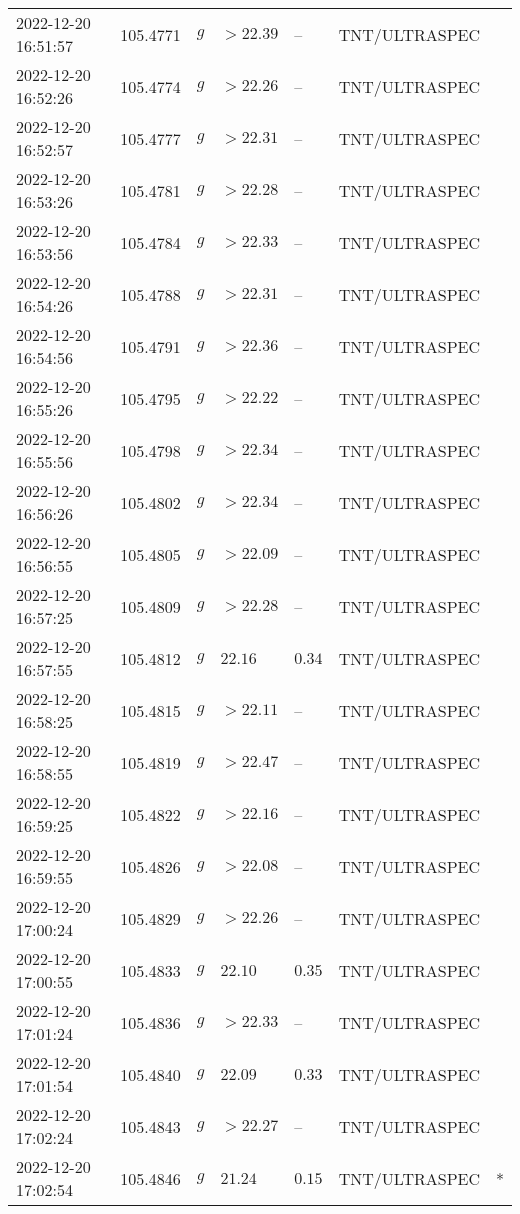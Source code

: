 \documentclass{nature_plusfigure}
\begin{document}
\begin{supplement}
\begin{center}
\begin{longtable}{lllllll}
2022-12-20 16:51:57 & 105.4771 & $g$ & $>22.39$ & -- & TNT/ULTRASPEC &  \\ 
2022-12-20 16:52:26 & 105.4774 & $g$ & $>22.26$ & -- & TNT/ULTRASPEC &  \\ 
2022-12-20 16:52:57 & 105.4777 & $g$ & $>22.31$ & -- & TNT/ULTRASPEC &  \\ 
2022-12-20 16:53:26 & 105.4781 & $g$ & $>22.28$ & -- & TNT/ULTRASPEC &  \\ 
2022-12-20 16:53:56 & 105.4784 & $g$ & $>22.33$ & -- & TNT/ULTRASPEC &  \\ 
2022-12-20 16:54:26 & 105.4788 & $g$ & $>22.31$ & -- & TNT/ULTRASPEC &  \\ 
2022-12-20 16:54:56 & 105.4791 & $g$ & $>22.36$ & -- & TNT/ULTRASPEC &  \\ 
2022-12-20 16:55:26 & 105.4795 & $g$ & $>22.22$ & -- & TNT/ULTRASPEC &  \\ 
2022-12-20 16:55:56 & 105.4798 & $g$ & $>22.34$ & -- & TNT/ULTRASPEC &  \\ 
2022-12-20 16:56:26 & 105.4802 & $g$ & $>22.34$ & -- & TNT/ULTRASPEC &  \\ 
2022-12-20 16:56:55 & 105.4805 & $g$ & $>22.09$ & -- & TNT/ULTRASPEC &  \\ 
2022-12-20 16:57:25 & 105.4809 & $g$ & $>22.28$ & -- & TNT/ULTRASPEC &  \\ 
2022-12-20 16:57:55 & 105.4812 & $g$ & $22.16$ & $0.34$ & TNT/ULTRASPEC &  \\ 
2022-12-20 16:58:25 & 105.4815 & $g$ & $>22.11$ & -- & TNT/ULTRASPEC &  \\ 
2022-12-20 16:58:55 & 105.4819 & $g$ & $>22.47$ & -- & TNT/ULTRASPEC &  \\ 
2022-12-20 16:59:25 & 105.4822 & $g$ & $>22.16$ & -- & TNT/ULTRASPEC &  \\ 
2022-12-20 16:59:55 & 105.4826 & $g$ & $>22.08$ & -- & TNT/ULTRASPEC &  \\ 
2022-12-20 17:00:24 & 105.4829 & $g$ & $>22.26$ & -- & TNT/ULTRASPEC &  \\ 
2022-12-20 17:00:55 & 105.4833 & $g$ & $22.10$ & $0.35$ & TNT/ULTRASPEC &  \\ 
2022-12-20 17:01:24 & 105.4836 & $g$ & $>22.33$ & -- & TNT/ULTRASPEC &  \\ 
2022-12-20 17:01:54 & 105.4840 & $g$ & $22.09$ & $0.33$ & TNT/ULTRASPEC &  \\ 
2022-12-20 17:02:24 & 105.4843 & $g$ & $>22.27$ & -- & TNT/ULTRASPEC &  \\ 
2022-12-20 17:02:54 & 105.4846 & $g$ & $21.24$ & $0.15$ & TNT/ULTRASPEC & * \\ 

\end{longtable}
\end{center}
\end{supplement}
\end{document}
